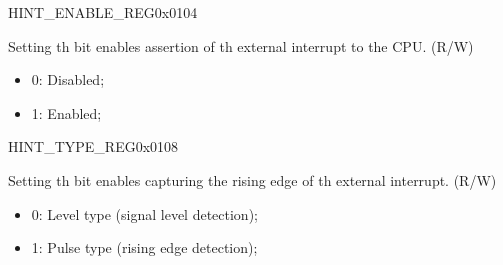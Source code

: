 
\begin{register}{H}{INT\_ENABLE\_REG}{0x0104}\label{regdesc:INTENABLEREG}
%
%
%
%
%
%
\regnewline%
\begin{regdesc}
\begin{reglist}
\item [INT\_ENABLE\lbrack\regindex{n}\rbrack] Setting th bit enables assertion of th external interrupt to the CPU. (R/W)
\begin{itemize}
    \setlength\itemsep{-1em}
    \item 0: Disabled;
    \item 1: Enabled;
\end{itemize}
\end{reglist}
\end{regdesc}
\end{register}

\begin{register}{H}{INT\_TYPE\_REG}{0x0108}\label{regdesc:INTTYPEREG}
%
%
%
%
%
%
\regnewline%
\begin{regdesc}
\begin{reglist}
\item [INT\_TYPE\lbrack\regindex{n}\rbrack] Setting th bit enables capturing the rising edge of th external interrupt. (R/W)
\begin{itemize}
    \setlength\itemsep{-1em}
    \item 0: Level type (signal level detection);
    \item 1: Pulse type (rising edge detection);
\end{itemize}
\end{reglist}
\end{regdesc}
\end{register}

